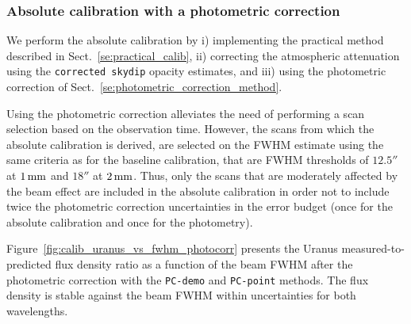 \subsubsection{Absolute calibration with a photometric correction}

We perform the absolute calibration by i) implementing the practical
method described in Sect.~\ref{se:practical_calib}, ii) correcting the
atmospheric attenuation using the {\tt corrected skydip} opacity
estimates, and iii) using the photometric correction of
Sect.~\ref{se:photometric_correction_method}.

Using the photometric correction alleviates the need of
performing a scan selection based on the observation time. However,
the scans from which the absolute calibration is derived, are selected
on the FWHM estimate using the same criteria as for the baseline
calibration, that are FWHM thresholds of $12.5''$ at $1\, \rm{mm}$ and $18''$ at
$2\, \rm{mm}$. Thus, only the scans that are moderately affected by the beam
effect are included in the absolute calibration in order not to
include twice the photometric correction uncertainties in the error
budget (once for the absolute calibration and once for the photometry).

Figure~\ref{fig:calib_uranus_vs_fwhm_photocorr} presents the Uranus
measured-to-predicted flux density ratio as a function of the beam FWHM
after the photometric correction with the {\tt PC-demo} and
{\tt PC-point} methods. The flux
density is stable against the beam FWHM within uncertainties for both
wavelengths.

